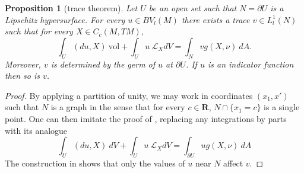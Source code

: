 \documentclass[reqno,12pt,letterpaper]{amsart}
\newcommand{\RR}{\mathbf{R}}
\newcommand{\vol}{\mathrm{vol}}
\newtheorem{proposition}[theorem]{Proposition}
\theoremstyle{definition}
\numberwithin{equation}{section}
\begin{document}
\begin{proposition}[trace theorem]\label{traces}
Let $U$ be an open set such that $N = \partial U$ is a Lipschitz hypersurface.
For every $u \in BV_l(M)$ there exists a trace $v \in L^1_l(N)$ such that for every $X \in C_c(M, TM)$,
\begin{equation}\label{Miranda IBP}
\int_U (du, X) ~\vol + \int_U u ~\mathcal L_XdV = \int_N vg(X, \nu) ~dA.
\end{equation}
Moreover, $v$ is determined by the germ of $u$ at $\partial U$.
If $u$ is an indicator function then so is $v$.
\end{proposition}
\begin{proof}
By applying a partition of unity, we may work in coordinates $(x_1, x')$ such that $N$ is a graph in the sense that for every $c \in \RR$, $N \cap \{x_1 = c\}$ is a single point.
One can then imitate the proof of \cite[Teorema 1]{Miranda67}, replacing any integrations by parts with its analogue
\begin{equation}
\label{Riemannian IBP}
\int_U (du, X) ~dV + \int_U u ~\mathcal L_XdV = \int_{\partial U} ug(X, \nu) ~dA
\end{equation}
The construction in \cite[Teorema 1]{Miranda67} shows that only the values of $u$ near $N$ affect $v$.
%
%
%
%

\end{proof}
\end{document}
